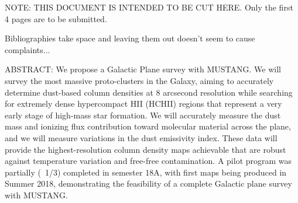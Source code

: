 \documentclass[11pt,preprint]{aastex_nofoot}
\begin{document}
\clearpage

NOTE: THIS DOCUMENT IS INTENDED TO BE CUT HERE.  Only the first 4 pages are to be submitted.


% 
% 
% 



\clearpage
{\color{red} Bibliographies take space and leaving them out doesn't seem to cause complaints...}
\footnotesize\raggedright
\noindent 
%

\normalsize
%


ABSTRACT:
We propose a Galactic Plane survey with MUSTANG. We will survey the most
massive proto-clusters in the Galaxy, aiming to accurately determine dust-based
column densities at 8 arcsecond resolution while searching for extremely dense
hypercompact HII (HCHII) regions that represent a very early stage of high-mass
star formation. We will accurately measure the dust mass and ionizing flux
contribution toward molecular material across the plane, and we will measure
variations in the dust emissivity index. These data will provide the
highest-resolution column density maps achievable that are robust against
temperature variation and free-free contamination.  A pilot program was
partially (~1/3) completed in semester 18A, with first maps being produced in
Summer 2018, demonstrating the feasibility of a complete Galactic plane survey
with MUSTANG.
\end{document}
